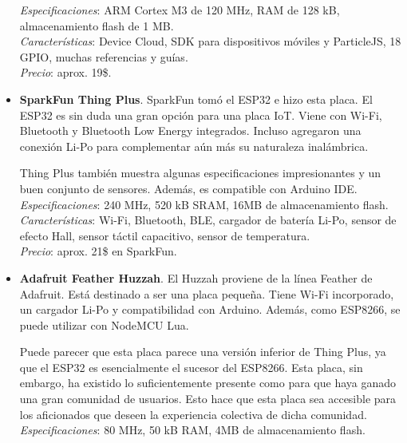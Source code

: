 \documentclass[12pt]{article}
\begin{document}
\begin{itemize}
		\textit{Especificaciones}:  ARM Cortex M3 de 120 MHz, RAM de 128 kB, almacenamiento flash de 1 MB.\\
		
		\textit{Características}: Device Cloud, SDK para dispositivos móviles y ParticleJS, 18 GPIO, muchas referencias y guías. \\
		
		\textit{Precio}: aprox. 19\$.\\
		
		\item \textbf{SparkFun Thing Plus}. SparkFun tomó el ESP32 e hizo esta placa. El ESP32 es sin duda una gran opción para una placa IoT. Viene con Wi-Fi, Bluetooth y Bluetooth Low Energy integrados. Incluso agregaron una conexión Li-Po para complementar aún más su naturaleza inalámbrica.
		
		Thing Plus también muestra algunas especificaciones impresionantes y un buen conjunto de sensores. Además, es compatible con Arduino IDE. \\
		
		\textit{Especificaciones}: 240 MHz, 520 kB SRAM, 16MB de almacenamiento flash. \\
		
		\textit{Características}: Wi-Fi, Bluetooth, BLE, cargador de batería Li-Po, sensor de efecto Hall, sensor táctil capacitivo, sensor de temperatura. \\
		
		\textit{Precio}: aprox. 21\$ en SparkFun.\\
		
		\item \textbf{Adafruit Feather Huzzah}. El Huzzah proviene de la línea Feather de Adafruit. Está destinado a ser una placa pequeña. Tiene Wi-Fi incorporado, un cargador Li-Po y compatibilidad con Arduino. Además, como ESP8266, se puede utilizar con NodeMCU Lua.
		
		Puede parecer que esta placa parece una versión inferior de Thing Plus, ya que el ESP32 es esencialmente el sucesor del ESP8266. Esta placa, sin embargo, ha existido lo suficientemente presente como para que haya ganado una gran comunidad de usuarios. Esto hace que esta placa sea accesible para los aficionados que deseen la experiencia colectiva de dicha comunidad. \\
		
		\textit{Especificaciones}: 80 MHz, 50 kB RAM, 4MB de almacenamiento flash. \\
		

\end{itemize}
\end{document}
